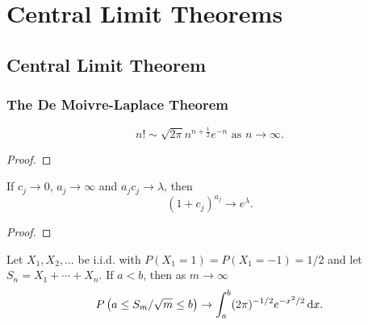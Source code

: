 \chapter{Central Limit Theorems}


\section{Central Limit Theorem}

\subsection{The De Moivre-Laplace Theorem}

\begin{lemma} \label{lem:stirling}
	\begin{equation}
		n ! \sim \sqrt{2 \pi} n^{n+\frac{1}{2}} e^{-n} \text{ as } n \rightarrow \infty.
	\end{equation}
\end{lemma}

\begin{proof}

\end{proof}

\begin{lemma} \label{lem:exp}
	If $c_j\rightarrow 0$, $a_j\rightarrow\infty$ and $a_jc_j\rightarrow\lambda$, then
	\begin{equation}
		\left(1+c_j\right)^{a_j}\rightarrow e^\lambda.
	\end{equation}
\end{lemma}

\begin{proof}

\end{proof}

\begin{theorem} \label{thm:de-moivre-laplace}
	Let $X_{1}, X_{2}, \ldots$ be i.i.d. with $P\left(X_{1}=1\right)=P\left(X_{1}=-1\right)=1 / 2$ and let $S_{n}=X_{1}+\cdots+X_{n}$. If $a<b$, then as $m \rightarrow \infty$
	\begin{equation}
		P\left(a \leq S_{m} / \sqrt{m} \leq b\right) \rightarrow \int_{a}^{b}(2 \pi)^{-1 / 2} e^{-x^{2} / 2} \mathop{}\!\mathrm{d} x.
	\end{equation}
\end{theorem}

